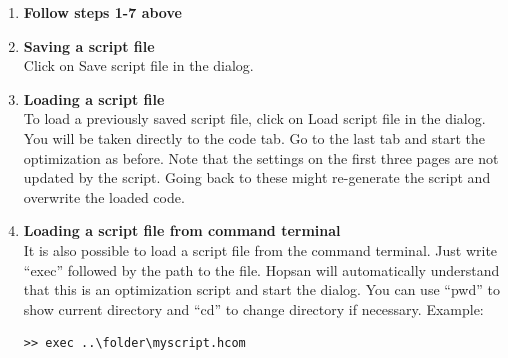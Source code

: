 \documentclass[a4paper,pdftex]{article}
\begin{document}
\begin{enumerate}
\item \textbf{Follow steps 1-7 above} \\

\item \textbf{Saving a script file} \\
Click on Save script file in the dialog.

\item \textbf{Loading a script file} \\
To load a previously saved script file, click on Load script file in the dialog. You will be taken directly to the code tab. Go to the last tab and start the optimization as before. Note that the settings on the first three pages are not updated by the script. Going back to these might re-generate the script and overwrite the loaded code.

\item \textbf{Loading a script file from command terminal} \\
It is also possible to load a script file from the command terminal. Just write \enquote{exec} followed by the path to the file. Hopsan will automatically understand that this is an optimization script and start the dialog. You can use \enquote{pwd} to show current directory and \enquote{cd} to change directory if necessary. Example:	
\begin{verbatim}
>> exec ..\folder\myscript.hcom
\end{verbatim}

\end{enumerate}
\end{document}
